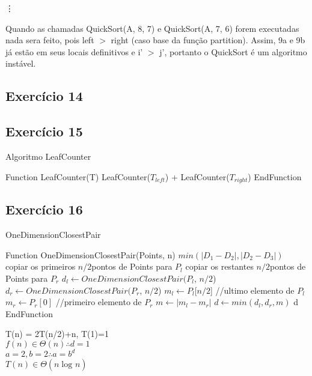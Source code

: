 \begin{tabbing}
\hspace{1em} \vdots
\end{tabbing}

Quando as chamadas QuickSort(A, 8, 7) e QuickSort(A, 7, 6) forem executadas nada sera feito, pois
left $>$ right (caso base da função partition). Assim, 9a e 9b já estão em seus locais 
definitivos e i' $>$ j', portanto o QuickSort é um algoritmo instável.

\subsection{Exercício 14}\label{sec:exer14}




\subsection{Exercício 15}\label{sec:exer15}

\begin{algorithm}
  \caption{Algoritmo LeafCounter}
  \begin{algorithmic}
    \STATE Function LeafCounter(T)
      \ENDIF
      \ENDIF
      \RETURN LeafCounter($T_{left}$) + LeafCounter($T_{right}$)
    \STATE EndFunction
  \end{algorithmic}
\end{algorithm}


\subsection{Exercício 16}\label{sec:exer16}

\begin{algorithm}
  \caption{OneDimensionClosestPair}
  \begin{algorithmic}
    \STATE Function OneDimensionClosestPair(Points, n)
        \RETURN $min(|D_1 - D_2|, |D_2 - D_3|)$
      \ELSE
        \STATE copiar os primeiros \big\lceil$n/2$\big\rceil pontos de Points para $P_l$
        \STATE copiar os restantes \big\lfloor$n/2$\big\rfloor pontos de Points para $P_r$
        \STATE $d_l \leftarrow OneDimensionClosestPair(P_l$, \big\lceil$n/2$\big\rceil)
        \STATE $d_r \leftarrow OneDimensionClosestPair(P_r$, \big\lfloor$n/2$\big\rfloor)
        \STATE $m_l \leftarrow P_l$[\big\lceil$n/2$\big{}] {//ultimo elemento de $P_l$}
        \STATE $m_r \leftarrow P_r[0]$ {//primeiro elemento de $P_r$}
        \STATE $m \leftarrow |m_l - m_r|$
        \STATE $d \leftarrow min(d_l, d_r, m)$
        \RETURN d
      \ENDIF
    \STATE EndFunction
  \end{algorithmic}
\end{algorithm}

T(n) = 2T(n/2)+n, T(1)=1 \\
  $f(n) \in \Theta(n) \therefore d=1$ \\
  $a = 2, b = 2 \therefore a=b^{d}$ \\
  $T(n) \in \Theta(n\log_{}n)$

